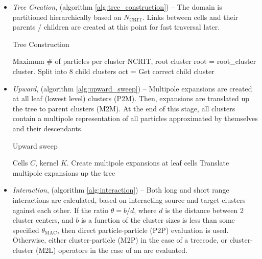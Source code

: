 \begin{itemize}

\item \emph{Tree Creation}, (algorithm \ref{alg:tree_construction}) -- The domain is partitioned hierarchically based on $N_{\text{CRIT}}$. Links between cells and their parents / children are created at this point for fast traversal later.

\begin{algorithm}
	\caption{Tree Construction}
	\label{alg:tree_construction}
	\begin{algorithmic}
		\Require Maximum \# of particles per cluster NCRIT, root cluster
		\State root = root\_cluster
			\State {}
		\EndFor
		\State
				\State cluster.
			\Else
					\State {} \Comment Split into 8 child clusters
				\EndIf
				\State oct =  \Comment Get correct child cluster
				\State {}
			\EndIf
		\EndProcedure
	\end{algorithmic}
\end{algorithm}

\item \emph{Upward}, (algorithm \ref{alg:upward_sweep}) -- Multipole expansions are created at all leaf (lowest level) clusters (P2M). Then, expansions are translated up the tree to parent clusters (M2M). At the end of this stage, all clusters contain a multipole representation of all particles approximated by themselves and their descendants.

\begin{algorithm}
	\caption{Upward sweep}
	\label{alg:upward_sweep}
	\begin{algorithmic}
		\Require Cells $C$, kernel $K$.
		\For{i=1,\;...,\;\Call{size}{$C$}}
			\If{\Call{is\_leaf}{$C_{i}$}} 
				\State {} \Comment Create multipole expansions at leaf cells
			\Else
				\State {}\Comment Translate multipole expansions up the tree
			\EndIf
		\EndFor
	\end{algorithmic}
\end{algorithm}

\item \emph{Interaction}, (algorithm \ref{alg:interaction}) -- Both long and short range interactions are calculated, based on interacting source and target clusters against each other. If the ratio $\theta = b / d$, where $d$ is the distance between 2 cluster centers, and $b$ is a function of the cluster sizes is less than some specified $\theta_{\text{MAC}}$, then direct particle-particle (P2P) evaluation is used. Otherwise, either cluster-particle (M2P) in the case of a treecode, or cluster-cluster (M2L) operators in the case of an {\fmm} are evaluated.


\end{itemize}
